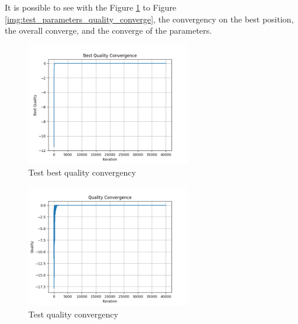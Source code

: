 

It is possible to see with the Figure \ref{img:test_best_quality_converge} to Figure \ref{img:test_parameters_quality_converge}, the convergency on the best position, the overall converge, and the converge of the parameters.

\begin{figure}
  \begin{center}
  \includegraphics[width=2.8in]{./../code/test_function_result/test_best_convergence.png}
  \caption{Test best quality convergency}
  \label{img:test_best_quality_converge}
  \end{center}
\end{figure}

\begin{figure}
  \begin{center}
  \includegraphics[width=2.8in]{./../code/test_function_result/test_quality_converge.png}
  \caption{Test quality convergency}
  \label{img:test_quality_converge}
  \end{center}
\end{figure}

